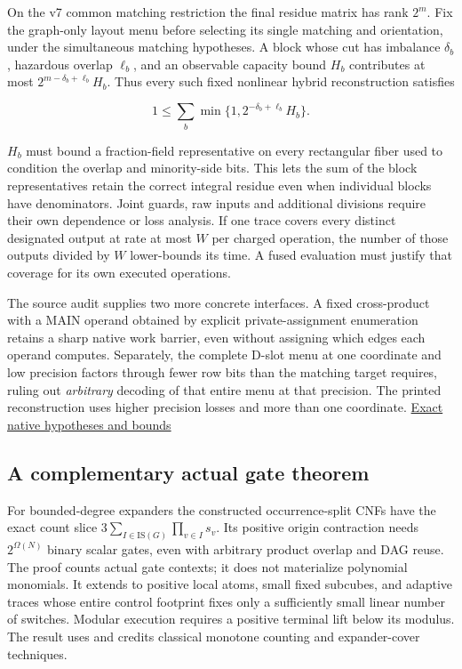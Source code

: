 \documentclass[
  11pt,
]{article}
\begin{document}
On the v7 common matching restriction the final residue matrix has rank
\(2^m\). Fix the graph-only layout menu before selecting its single
matching and orientation, under the simultaneous matching hypotheses. A
block whose cut has imbalance \(\delta_b\), hazardous overlap
\(\ell_b\), and an observable capacity bound \(H_b\) contributes at most
\(2^{m-\delta_b+\ell_b}H_b\). Thus every such fixed nonlinear hybrid
reconstruction satisfies

\[
 1\le\sum_b\min\{1,2^{-\delta_b+\ell_b}H_b\}. \tag{U7}
\]

\(H_b\) must bound a fraction-field representative on every rectangular
fiber used to condition the overlap and minority-side bits. This lets
the sum of the block representatives retain the correct integral residue
even when individual blocks have denominators. Joint guards, raw inputs
and additional divisions require their own dependence or loss analysis.
If one trace covers every distinct designated output at rate at most
\(W\) per charged operation, the number of those outputs divided by
\(W\) lower-bounds its time. A fused evaluation must justify that
coverage for its own executed operations.

The source audit supplies two more concrete interfaces. A fixed
cross-product with a MAIN operand obtained by explicit
private-assignment enumeration retains a sharp native work barrier, even
without assigning which edges each operand computes. Separately, the
complete D-slot menu at one coordinate and low precision factors through
fewer row bits than the matching target requires, ruling out
\emph{arbitrary} decoding of that entire menu at that precision. The
printed reconstruction uses higher precision losses and more than one
coordinate. \hyperref[v8-section-native-escape]{Exact native hypotheses and
bounds}

\subsection{A complementary actual gate
theorem}\label{v8-a-complementary-actual-gate-theorem}

For bounded-degree expanders the constructed occurrence-split CNFs have
the exact count slice \(3\sum_{I\in\mathrm{IS}(G)}\prod_{v\in I}s_v\).
Its positive origin contraction needs \(2^{\Omega(N)}\) binary scalar
gates, even with arbitrary product overlap and DAG reuse. The proof
counts actual gate contexts; it does not materialize polynomial
monomials. It extends to positive local atoms, small fixed subcubes, and
adaptive traces whose entire control footprint fixes only a sufficiently
small linear number of switches. Modular execution requires a positive
terminal lift below its modulus. The result uses and credits classical
monotone counting and expander-cover techniques.
\end{document}
